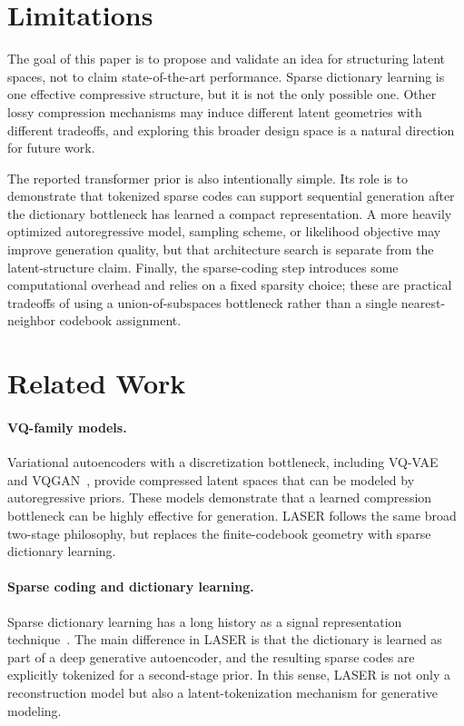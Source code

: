 \documentclass[10pt]{article}
\begin{document}
\section{Limitations}

The goal of this paper is to propose and validate an idea for structuring latent spaces, not to claim state-of-the-art performance. Sparse dictionary learning is one effective compressive structure, but it is not the only possible one. Other lossy compression mechanisms may induce different latent geometries with different tradeoffs, and exploring this broader design space is a natural direction for future work.

The reported transformer prior is also intentionally simple. Its role is to demonstrate that tokenized sparse codes can support sequential generation after the dictionary bottleneck has learned a compact representation. A more heavily optimized autoregressive model, sampling scheme, or likelihood objective may improve generation quality, but that architecture search is separate from the latent-structure claim. Finally, the sparse-coding step introduces some computational overhead and relies on a fixed sparsity choice; these are practical tradeoffs of using a union-of-subspaces bottleneck rather than a single nearest-neighbor codebook assignment.

\section{Related Work}

\paragraph{VQ-family models.}
Variational autoencoders with a discretization bottleneck, including VQ-VAE~\citep{oord2017vqvae} and VQGAN~\citep{esser2021vqgan}, provide compressed latent spaces that can be modeled by autoregressive priors. These models demonstrate that a learned compression bottleneck can be highly effective for generation. LASER follows the same broad two-stage philosophy, but replaces the finite-codebook geometry with sparse dictionary learning.

\paragraph{Sparse coding and dictionary learning.}
Sparse dictionary learning has a long history as a signal representation technique~\citep{olshausen1997sparse,aharon2006ksvd,tropp2007omp}. The main difference in LASER is that the dictionary is learned as part of a deep generative autoencoder, and the resulting sparse codes are explicitly tokenized for a second-stage prior. In this sense, LASER is not only a reconstruction model but also a latent-tokenization mechanism for generative modeling.
\end{document}
